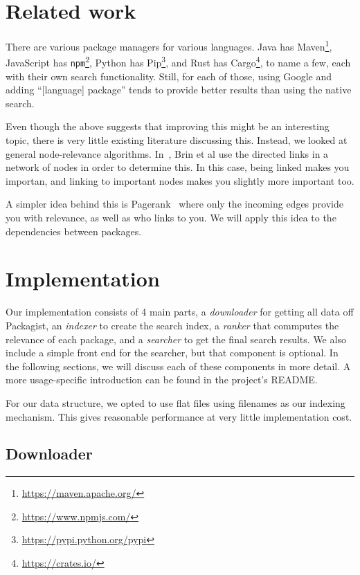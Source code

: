 \documentclass{article}
\begin{document}
\section{Related work}

There are various package managers for various languages. Java has Maven\footnote{\url{https://maven.apache.org/}}, JavaScript has \texttt{npm}\footnote{\url{https://www.npmjs.com/}}, Python has Pip\footnote{\url{https://pypi.python.org/pypi}}, and Rust has Cargo\footnote{\url{https://crates.io/}}, to name a few, each with their own search functionality. Still, for each of those, using Google and adding ``[language] package'' tends to provide better results than using the native search.

Even though the above suggests that improving this might be an interesting topic, there is very little existing literature discussing this. Instead, we looked at general node-relevance algorithms. In~\cite{google}, Brin et al use the directed links in a network of nodes in order to determine this. In this case, being linked makes you importan, and linking to important nodes makes you slightly more important too.

A simpler idea behind this is Pagerank~\cite{pagerank} where only the incoming edges provide you with relevance, as well as who links to you. We will apply this idea to the dependencies between packages.

\section{Implementation}

Our implementation consists of 4 main parts, a \emph{downloader} for getting all data off Packagist, an \emph{indexer} to create the search index, a \emph{ranker} that commputes the relevance of each package, and a \emph{searcher} to get the final search results. We also include a simple front end for the searcher, but that component is optional. In the following sections, we will discuss each of these components in more detail. A more usage-specific introduction can be found in the project's README.

For our data structure, we opted to use flat files using filenames as our indexing mechanism. This gives reasonable performance at very little implementation cost.

\subsection{Downloader}
\end{document}
